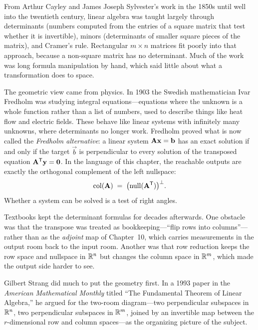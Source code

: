 \begin{historybox}
From Arthur Cayley and James Joseph Sylvester's work in the 1850s until well into the twentieth
century, linear algebra was taught largely through determinants (numbers computed from the
entries of a square matrix that test whether it is invertible), minors (determinants of smaller
square pieces of the matrix), and Cramer's rule. Rectangular $m \times n$ matrices fit poorly into
that approach, because a non-square matrix has no determinant. Much of the work was long
formula manipulation by hand, which said little about what a transformation does to space.

The geometric view came from physics. In 1903 the Swedish mathematician Ivar Fredholm was
studying integral equations---equations where the unknown is a whole function rather than a list
of numbers, used to describe things like heat flow and electric fields. These behave like linear
systems with infinitely many unknowns, where determinants no longer work. Fredholm proved what is
now called the \emph{Fredholm alternative}: a linear system $\mathbf{A}\mathbf{x}=\mathbf{b}$ has an exact
solution if and only if the target $\vec{b}$ is perpendicular to every solution of the transposed
equation $\mathbf{A}^{\mathsf{T}}\mathbf{y}=\mathbf{0}$. In the language of this chapter, the reachable outputs are
exactly the orthogonal complement of the left nullspace:
\[
  \operatorname{col}(\mathbf{A}) \;=\; \bigl(\operatorname{null}(\mathbf{A}^{\mathsf{T}})\bigr)^\perp.
\]
Whether a system can be solved is a test of right angles.

Textbooks kept the determinant formulas for decades afterwards. One obstacle was that the
transpose was treated as bookkeeping---``flip rows into columns''---rather than as the
\emph{adjoint} map of Chapter~10, which carries measurements in the output room back to the input
room. Another was that row reduction keeps the row space and nullspace in $\mathbb{R}^n$ but changes the
column space in $\mathbb{R}^m$, which made the output side harder to see.

Gilbert Strang did much to put the geometry first. In a 1993 paper in the \emph{American
Mathematical Monthly} titled ``The Fundamental Theorem of Linear Algebra,'' he argued for the
two-room diagram---two perpendicular subspaces in $\mathbb{R}^n$, two perpendicular subspaces in $\mathbb{R}^m$,
joined by an invertible map between the $r$-dimensional row and column spaces---as the
organizing picture of the subject.


\end{historybox}
